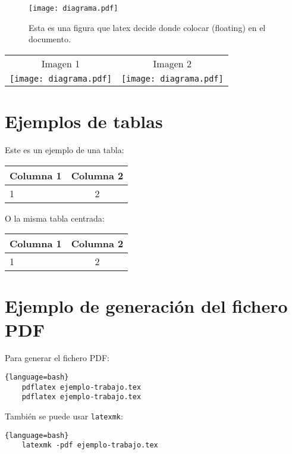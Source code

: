 \documentclass[twoside,spanish,a4paper,12pt]{cls/twcam-entregable}
\begin{document}
  \begin{figure}[!htb]
    \texttt{[image: diagrama.pdf]}
    \caption{Esta es una figura que latex decide donde colocar (floating) en el documento.}
    \label{fig:diagrama}
    \end{figure}

  \begin{tabular}{cc}
    Imagen 1 & Imagen 2 \\[2mm]
    \texttt{[image: diagrama.pdf]} &  \texttt{[image: diagrama.pdf]}
  \end{tabular}

\section{Ejemplos de tablas}

  Este es un ejemplo de una tabla:

  \begin{tabular}{|l|c|}
    \hline
    Columna 1 & Columna 2 \\ \hline
    1 & 2 \\ \hline
  \end{tabular}


  \vspace*{1cm}
  O la misma tabla centrada:

  \begin{center}
    \begin{tabular}{|l|c|}
      \hline
      Columna 1 & Columna 2 \\ \hline
      1 & 2 \\ \hline
    \end{tabular}
  \end{center}

\section{Ejemplo de generación del fichero PDF}

  Para generar el fichero PDF:

  \begin{lstlisting}{language=bash}
    pdflatex ejemplo-trabajo.tex
    pdflatex ejemplo-trabajo.tex
\end{lstlisting}

  También se puede usar \texttt{latexmk}:
  \begin{lstlisting}{language=bash}
    latexmk -pdf ejemplo-trabajo.tex
\end{lstlisting}



\end{document}
